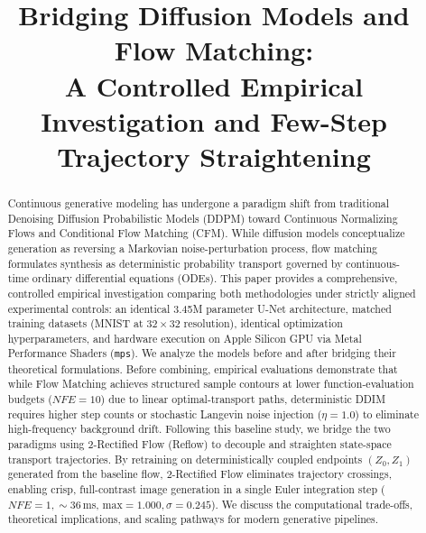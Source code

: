 \documentclass[conference]{IEEEtran}
\begin{document}
\title{Bridging Diffusion Models and Flow Matching: \\ A Controlled Empirical Investigation and Few-Step Trajectory Straightening}

\author{
}

\maketitle

\begin{abstract}
Continuous generative modeling has undergone a paradigm shift from traditional Denoising Diffusion Probabilistic Models (DDPM) toward Continuous Normalizing Flows and Conditional Flow Matching (CFM). While diffusion models conceptualize generation as reversing a Markovian noise-perturbation process, flow matching formulates synthesis as deterministic probability transport governed by continuous-time ordinary differential equations (ODEs). This paper provides a comprehensive, controlled empirical investigation comparing both methodologies under strictly aligned experimental controls: an identical 3.45M parameter U-Net architecture, matched training datasets (MNIST at $32 \times 32$ resolution), identical optimization hyperparameters, and hardware execution on Apple Silicon GPU via Metal Performance Shaders (\texttt{mps}). We analyze the models before and after bridging their theoretical formulations. Before combining, empirical evaluations demonstrate that while Flow Matching achieves structured sample contours at lower function-evaluation budgets ($NFE = 10$) due to linear optimal-transport paths, deterministic DDIM requires higher step counts or stochastic Langevin noise injection ($\eta = 1.0$) to eliminate high-frequency background drift. Following this baseline study, we bridge the two paradigms using 2-Rectified Flow (Reflow) to decouple and straighten state-space transport trajectories. By retraining on deterministically coupled endpoints $(Z_0, Z_1)$ generated from the baseline flow, 2-Rectified Flow eliminates trajectory crossings, enabling crisp, full-contrast image generation in a single Euler integration step ($NFE = 1, \sim 36$\,ms, $\text{max} = 1.000, \sigma = 0.245$). We discuss the computational trade-offs, theoretical implications, and scaling pathways for modern generative pipelines.
\end{abstract}
\end{document}
